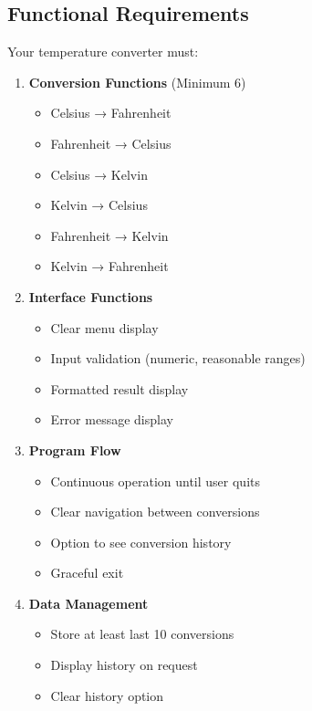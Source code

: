 \documentclass[
  letterpaper,
  DIV=11,
  numbers=noendperiod,
  oneside]{scrreprt}
\providecommand{\tightlist}{%
  \setlength{\itemsep}{0pt}\setlength{\parskip}{0pt}}\usepackage{longtable,booktabs,array}
\begin{document}
\subsection{Functional Requirements}\label{functional-requirements-4}

Your temperature converter must:

\begin{enumerate}
\def\labelenumi{\arabic{enumi}.}
\tightlist
\item
  \textbf{Conversion Functions} (Minimum 6)

  \begin{itemize}
  \tightlist
  \item
    Celsius → Fahrenheit
  \item
    Fahrenheit → Celsius
  \item
    Celsius → Kelvin
  \item
    Kelvin → Celsius
  \item
    Fahrenheit → Kelvin
  \item
    Kelvin → Fahrenheit
  \end{itemize}
\item
  \textbf{Interface Functions}

  \begin{itemize}
  \tightlist
  \item
    Clear menu display
  \item
    Input validation (numeric, reasonable ranges)
  \item
    Formatted result display
  \item
    Error message display
  \end{itemize}
\item
  \textbf{Program Flow}

  \begin{itemize}
  \tightlist
  \item
    Continuous operation until user quits
  \item
    Clear navigation between conversions
  \item
    Option to see conversion history
  \item
    Graceful exit
  \end{itemize}
\item
  \textbf{Data Management}

  \begin{itemize}
  \tightlist
  \item
    Store at least last 10 conversions
  \item
    Display history on request
  \item
    Clear history option
  \end{itemize}
\end{enumerate}
\end{document}
